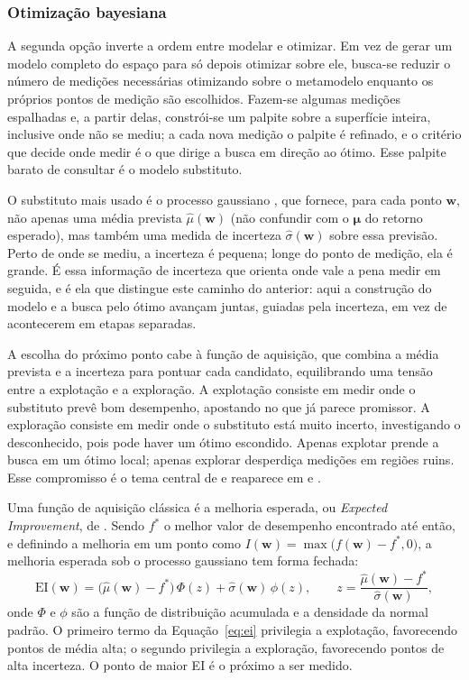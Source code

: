 \documentclass[12pt,a4paper]{article}
\begin{document}
\subsubsection{Otimização bayesiana}

A segunda opção inverte a ordem entre modelar e otimizar. Em vez de gerar um modelo completo do espaço para só depois otimizar sobre ele, busca-se reduzir o número de medições necessárias otimizando sobre o metamodelo enquanto os próprios pontos de medição são escolhidos. Fazem-se algumas medições espalhadas e, a partir delas, constrói-se um palpite sobre a superfície inteira, inclusive onde não se mediu; a cada nova medição o palpite é refinado, e o critério que decide onde medir é o que dirige a busca em direção ao ótimo. Esse palpite barato de consultar é o modelo substituto.

O substituto mais usado é o processo gaussiano \cite{rasmussen2006gaussian}, que fornece, para cada ponto $\mathbf{w}$, não apenas uma média prevista $\hat{\mu}(\mathbf{w})$ (não confundir com o $\boldsymbol{\mu}$ do retorno esperado), mas também uma medida de incerteza $\hat{\sigma}(\mathbf{w})$ sobre essa previsão. Perto de onde se mediu, a incerteza é pequena; longe do ponto de medição, ela é grande. É essa informação de incerteza que orienta onde vale a pena medir em seguida, e é ela que distingue este caminho do anterior: aqui a construção do modelo e a busca pelo ótimo avançam juntas, guiadas pela incerteza, em vez de acontecerem em etapas separadas.

A escolha do próximo ponto cabe à função de aquisição, que combina a média prevista e a incerteza para pontuar cada candidato, equilibrando uma tensão entre a explotação e a exploração. A explotação consiste em medir onde o substituto prevê bom desempenho, apostando no que já parece promissor. A exploração consiste em medir onde o substituto está muito incerto, investigando o desconhecido, pois pode haver um ótimo escondido. Apenas explotar prende a busca em um ótimo local; apenas explorar desperdiça medições em regiões ruins. Esse compromisso é o tema central de  e reaparece em  e .

Uma função de aquisição clássica é a melhoria esperada, ou \textit{Expected Improvement}, de . Sendo $f^\ast$ o melhor valor de desempenho encontrado até então, e definindo a melhoria em um ponto como $I(\mathbf{w}) = \max\!\big(f(\mathbf{w}) - f^\ast, 0\big)$, a melhoria esperada sob o processo gaussiano tem forma fechada:
\begin{equation}
\mathrm{EI}(\mathbf{w}) = \big(\hat{\mu}(\mathbf{w}) - f^\ast\big)\,\Phi(z) + \hat{\sigma}(\mathbf{w})\,\phi(z),
\qquad
z = \frac{\hat{\mu}(\mathbf{w}) - f^\ast}{\hat{\sigma}(\mathbf{w})},
\label{eq:ei}
\end{equation}
onde $\Phi$ e $\phi$ são a função de distribuição acumulada e a densidade da normal padrão. O primeiro termo da Equação~\eqref{eq:ei} privilegia a explotação, favorecendo pontos de média alta; o segundo privilegia a exploração, favorecendo pontos de alta incerteza. O ponto de maior EI é o próximo a ser medido.
\end{document}
